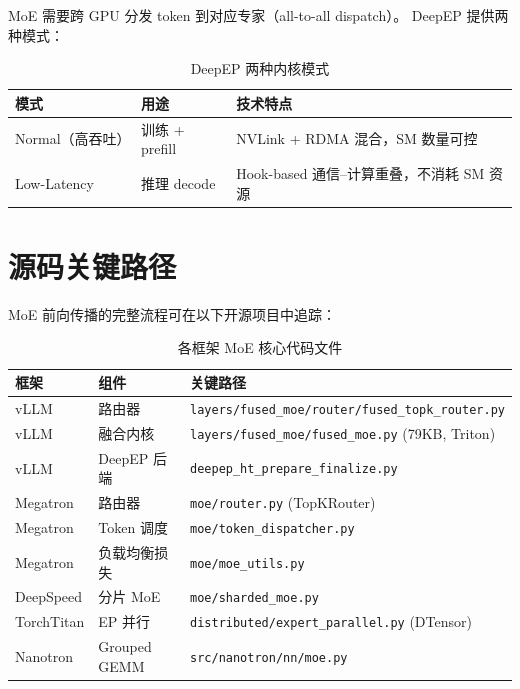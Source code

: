 \documentclass[
  customlatinfont = macos,
]{hkustthesis}
\begin{document}
MoE 需要跨 GPU 分发 token 到对应专家（all-to-all dispatch）。
DeepEP 提供两种模式：

\begin{table}[H]
\centering\small
\caption{DeepEP 两种内核模式}
\begin{tabularx}{\linewidth}{l l X}
\toprule
\textbf{模式} & \textbf{用途} & \textbf{技术特点} \\
\midrule
Normal（高吞吐） & 训练 + prefill & NVLink + RDMA 混合，SM 数量可控 \\
Low-Latency      & 推理 decode  & Hook-based 通信--计算重叠，不消耗 SM 资源 \\
\bottomrule
\end{tabularx}
\end{table}

\section{源码关键路径}

MoE 前向传播的完整流程可在以下开源项目中追踪：

\begin{table}[H]
\centering\small
\caption{各框架 MoE 核心代码文件}
\label{tab:moe-code}
\begin{tabularx}{\linewidth}{l l X}
\toprule
\textbf{框架} & \textbf{组件} & \textbf{关键路径} \\
\midrule
vLLM & 路由器 & \texttt{layers/fused\_moe/router/fused\_topk\_router.py} \\
vLLM & 融合内核 & \texttt{layers/fused\_moe/fused\_moe.py} (79KB, Triton) \\
vLLM & DeepEP 后端 & \texttt{deepep\_ht\_prepare\_finalize.py} \\
Megatron & 路由器 & \texttt{moe/router.py} (TopKRouter) \\
Megatron & Token 调度 & \texttt{moe/token\_dispatcher.py} \\
Megatron & 负载均衡损失 & \texttt{moe/moe\_utils.py} \\
DeepSpeed & 分片 MoE & \texttt{moe/sharded\_moe.py} \\
TorchTitan & EP 并行 & \texttt{distributed/expert\_parallel.py} (DTensor) \\
Nanotron & Grouped GEMM & \texttt{src/nanotron/nn/moe.py} \\
\bottomrule
\end{tabularx}
\end{table}


\end{document}
